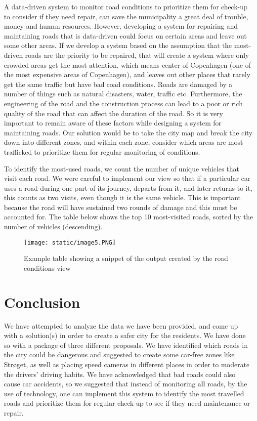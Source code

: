 \documentclass[format=acmsmall, review=false, screen=true]{acmart}
\begin{document}
A data-driven system to monitor road conditions to prioritize them for check-up to consider if they need repair, can save the municipality a great deal of trouble, money and human resources. However, developing a system for repairing and maintaining roads that is data-driven could focus on certain areas and leave out some other areas. If we develop a system based on the assumption that the most-driven roads are the priority to be repaired, that will create a system where only crowded areas get the most attention, which means center of Copenhagen (one of the most expensive areas of Copenhagen), and leaves out other places that rarely get the same traffic but have bad road conditions. Roads are damaged by a number of things such as natural disasters, water, traffic etc. Furthermore, the engineering of the road and the construction process can lead to a poor or rich quality of the road that can affect the duration of the road. So it is very important to remain aware of these factors while designing a system for maintaining roads. Our solution would be to take the city map and break the city down into different zones, and within each zone, consider which areas are most trafficked to prioritize them for regular monitoring of conditions.

To identify the most-used roads, we count the number of unique vehicles that visit each road. We were careful to implement our view so that if a particular car uses a road during one part of its journey, departs from it, and later returns to it, this counts as two visits, even though it is the same vehicle. This is important because the road will have sustained two rounds of damage and this must be accounted for. The table below shows the top 10 most-visited roads, sorted by the number of vehicles (descending).

\begin{figure}[H]
  \texttt{[image: static/image5.PNG]}
  \caption{Example table showing a snippet of the output created by the road conditions view}
  \label{fig:verticalpartitioning-diagram}
\end{figure}

\section{Conclusion}

We have attempted to analyze the data we have been provided, and come up with a solution(s) in order to create a safer city for the residents. We have done so with a package of three different proposals. We have identified which roads in the city could be dangerous and suggested to create some car-free zones like Strøget, as well as placing speed cameras in different places in order to moderate the drivers’ driving habits. We have acknowledged that bad roads could also cause car accidents, so we suggested that instead of monitoring all roads, by the use of technology, one can implement this system to identify the most travelled roads and prioritize them for regular check-up to see if they need maintenance or repair.
\end{document}
